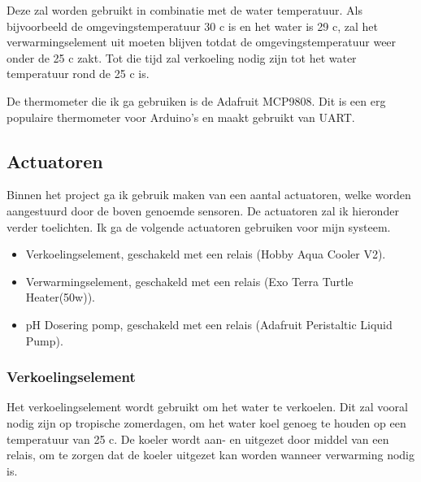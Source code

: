 \documentclass[a4paper]{report}
\begin{document}
Deze zal worden gebruikt in combinatie met de water temperatuur. Als bijvoorbeeld de omgevingstemperatuur 30 \textdegree c is en het water is 29 \textdegree c, zal het verwarmingselement uit moeten blijven totdat de omgevingstemperatuur weer onder de 25 \textdegree c zakt. Tot die tijd zal verkoeling nodig zijn tot het water temperatuur rond de 25 \textdegree c is.

De thermometer die ik ga gebruiken is de Adafruit MCP9808. Dit is een erg populaire thermometer voor Arduino's en maakt gebruikt van UART.

\subsection{Actuatoren}
Binnen het project ga ik gebruik maken van een aantal actuatoren, welke worden aangestuurd door de boven genoemde sensoren.
De actuatoren zal ik hieronder verder toelichten. Ik ga de volgende actuatoren gebruiken voor mijn systeem.
\begin{itemize}
  \item Verkoelingselement, geschakeld met een relais (Hobby Aqua Cooler V2).
  \item Verwarmingselement, geschakeld met een relais (Exo Terra Turtle Heater(50w)).
  \item pH Dosering pomp, geschakeld met een relais (Adafruit Peristaltic Liquid Pump).
\end{itemize}

\subsubsection{Verkoelingselement}
Het verkoelingselement wordt gebruikt om het water te verkoelen. 
Dit zal vooral nodig zijn op tropische zomerdagen, om het water koel genoeg te houden op een temperatuur van 25 \textdegree c.
De koeler wordt aan- en uitgezet door middel van een relais, om te zorgen dat de koeler uitgezet kan worden wanneer verwarming nodig is.
\end{document}
